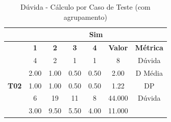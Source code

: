\begin{table}[htbp]
	\centering
	\caption{Dúvida - Cálculo por Caso de Teste (com agrupamento)}
	\begin{tabular}{|ccccccc|}
		\hline
		\rowcolor[HTML]{D0CECE} 
		\rowcolor[HTML]{F2F2F2} 
		\multicolumn{1}{|l|}{\cellcolor[HTML]{F2F2F2}\textbf{Agrupamento}} &
		\multicolumn{6}{c|}{\cellcolor[HTML]{F2F2F2}\textbf{Sim}} \\ \hline
		\rowcolor[HTML]{D0CECE} 
		\multicolumn{1}{|c|}{\cellcolor[HTML]{D0CECE}\textbf{Participante}} &
		\multicolumn{1}{c|}{\cellcolor[HTML]{D0CECE}\textbf{1}} &
		\multicolumn{1}{c|}{\cellcolor[HTML]{D0CECE}\textbf{2}} &
		\multicolumn{1}{c|}{\cellcolor[HTML]{D0CECE}\textbf{3}} &
		\multicolumn{1}{c|}{\cellcolor[HTML]{D0CECE}\textbf{4}} &
		\multicolumn{1}{c|}{\cellcolor[HTML]{D0CECE}\textbf{Valor}} &
		\textbf{Métrica} \\ \hline
		\multicolumn{1}{|c|}{\cellcolor[HTML]{F2F2F2}} &
		\multicolumn{1}{c|}{4} &
		\multicolumn{1}{c|}{2} &
		\multicolumn{1}{c|}{1} &
		\multicolumn{1}{c|}{1} &
		\multicolumn{1}{c|}{8} &
		Dúvida \\ \cline{2-7} 
		\rowcolor[HTML]{D9D9D9} 
		\multicolumn{1}{|c|}{\cellcolor[HTML]{F2F2F2}} &
		\multicolumn{1}{c|}{\cellcolor[HTML]{D9D9D9}2.00} &
		\multicolumn{1}{c|}{\cellcolor[HTML]{D9D9D9}1.00} &
		\multicolumn{1}{c|}{\cellcolor[HTML]{D9D9D9}0.50} &
		\multicolumn{1}{c|}{\cellcolor[HTML]{D9D9D9}0.50} &
		\multicolumn{1}{c|}{\cellcolor[HTML]{D9D9D9}2.00} &
		D Média \\ \cline{2-7} 
		\multicolumn{1}{|c|}{\multirow{-3}{*}{\cellcolor[HTML]{F2F2F2}\textbf{T02}}} &
		\multicolumn{1}{c|}{1.00} &
		\multicolumn{1}{c|}{1.00} &
		\multicolumn{1}{c|}{0.50} &
		\multicolumn{1}{c|}{0.50} &
		\multicolumn{1}{c|}{1.22} &
		DP \\ \hline
		\rowcolor[HTML]{D9D9D9} 
		\multicolumn{1}{|c|}{\cellcolor[HTML]{F2F2F2}} &
		\multicolumn{1}{c|}{\cellcolor[HTML]{D9D9D9}6} &
		\multicolumn{1}{c|}{\cellcolor[HTML]{D9D9D9}19} &
		\multicolumn{1}{c|}{\cellcolor[HTML]{D9D9D9}11} &
		\multicolumn{1}{c|}{\cellcolor[HTML]{D9D9D9}8} &
		\multicolumn{1}{c|}{\cellcolor[HTML]{D9D9D9}44.000} &
		Dúvida \\ \cline{2-7} 
		\multicolumn{1}{|c|}{\cellcolor[HTML]{F2F2F2}} &
		\multicolumn{1}{c|}{3.00} &
		\multicolumn{1}{c|}{9.50} &
		\multicolumn{1}{c|}{5.50} &
		\multicolumn{1}{c|}{4.00} &
		\multicolumn{1}{c|}{11.000} &

\end{tabular}
\end{table}
